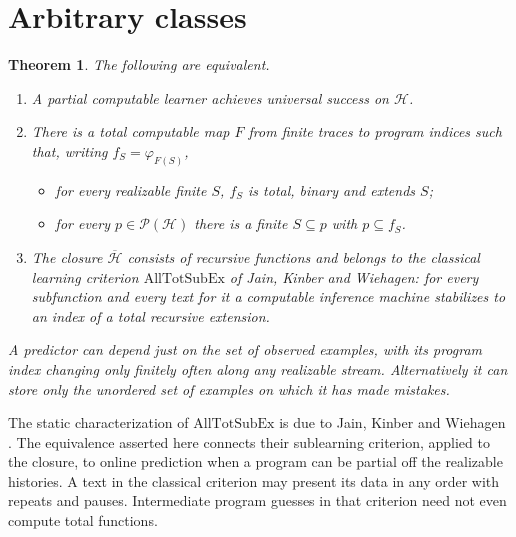 \documentclass[11pt]{article}
\newtheorem{theorem}{Theorem}
\newcommand{\cl}{\overline{\mathcal H}}
\newcommand{\HH}{\mathcal H}
\begin{document}
\section{Arbitrary classes}
\begin{theorem}\label{univ}
The following are equivalent.
\begin{enumerate}
\item A partial computable learner achieves universal success on $\HH$.
\item There is a total computable map $F$ from finite traces to program indices such that, writing $f_S=\varphi_{F(S)}$,
\begin{itemize}
\item for every realizable finite $S$, $f_S$ is total, binary and extends $S$;
\item for every $p\in\mathcal P(\HH)$ there is a finite $S\subseteq p$ with $p\subseteq f_S$.
\end{itemize}
\item The closure $\cl$ consists of recursive functions and belongs to the classical learning criterion $\mathrm{AllTotSubEx}$ of Jain, Kinber and Wiehagen: for every subfunction and every text for it a computable inference machine stabilizes to an index of a total recursive extension.
\end{enumerate}
A predictor can depend just on the set of observed examples, with its program index changing only finitely often along any realizable stream. Alternatively it can store only the unordered set of examples on which it has made mistakes.
\end{theorem}

The static characterization of $\mathrm{AllTotSubEx}$ is due to Jain, Kinber and Wiehagen \cite[Corollary~40]{jkw}. The equivalence asserted here connects their sublearning criterion, applied to the closure, to online prediction when a program can be partial off the realizable histories. A text in the classical criterion may present its data in any order with repeats and pauses. Intermediate program guesses in that criterion need not even compute total functions.
\end{document}
